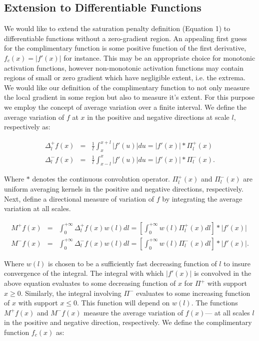 \documentclass{article} %
\begin{document}
\subsection{Extension to Differentiable Functions}
We would like to extend the saturation penalty definition (Equation 1) to differentiable functions without a zero-gradient region. An appealing first guess for the complimentary function is some positive function of the first derivative, $f_c(x) = |f'(x)|$ for instance. This may be an appropriate choice for monotonic activation functions, however non-monotonic activation functions may contain regions of small or zero gradient which have negligible extent, i.e. the extrema. We would like our definition of the complimentary function to not only measure the local gradient in some region but also to measure it's extent. For this purpose we employ the concept of average variation \cite{??} over a finite interval. We define the average variation of $f$ at $x$ in the positive and negative directions at scale $l$, respectively as: 

\begin{eqnarray}
\nonumber
\Delta_l^+ f(x) &=& \frac{1}{l} \int_x ^{x+l} |f'(u)| du = |f'(x)| * \Pi_l^+(x)\\
\nonumber
\Delta_l^- f(x) &=& \frac{1}{l} \int_{x-l} ^x |f'(u)| du = |f'(x)| * \Pi_l^-(x).
\end{eqnarray} 

Where $*$ denotes the continuous convolution operator. $\Pi_l^+(x)$ and $\Pi_l^-(x)$ are uniform averaging kernels in the positive and negative directions, respectively. Next, define a directional measure of variation of $f$ by integrating the average variation at all scales. 

\begin{eqnarray}
\nonumber
M^+ f(x) &=& \int_0^{+\infty} \Delta_l^+ f(x) w(l)dl = \left[\int_0^{+\infty} w(l) \Pi^+_l(x) dl \right] * |f'(x)| \\
\nonumber
M^- f(x) &=& \int_0^{+\infty} \Delta_l^- f(x) w(l)dl = \left[\int_0^{+\infty} w(l) \Pi^-_l(x) dl \right] * |f'(x)| .
\end{eqnarray} 

Where $w(l)$ is chosen to be a sufficiently fast decreasing function of $l$ to insure convergence of the integral. The integral with which $|f'(x)|$ is convolved in the above equation evaluates to some decreasing function of $x$ for $\Pi^+$ with support $x \geq 0$. Similarly, the integral involving $\Pi^-$ evaluates to some increasing function of $x$ with support $x \leq 0$. This function will depend on $w(l)$. The functions $M^+f(x)$ and $M^-f(x)$ measure the average variation of $f(x)$--- at all scales $l$ in the positive and negative direction, respectively. We define the complimentary function $f_c(x)$ as: 
\end{document}
